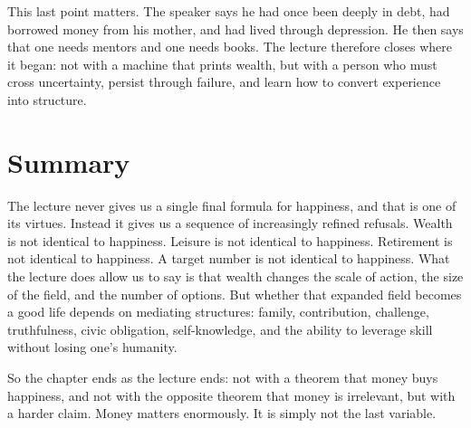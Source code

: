 This last point matters. The speaker says he had once been deeply in debt, had borrowed money from his mother, and had lived through depression. He then says that one needs mentors and one needs books. The lecture therefore closes where it began: not with a machine that prints wealth, but with a person who must cross uncertainty, persist through failure, and learn how to convert experience into structure.

\section{Summary}

The lecture never gives us a single final formula for happiness, and that is one of its virtues. Instead it gives us a sequence of increasingly refined refusals. Wealth is not identical to happiness. Leisure is not identical to happiness. Retirement is not identical to happiness. A target number is not identical to happiness. What the lecture does allow us to say is that wealth changes the scale of action, the size of the field, and the number of options. But whether that expanded field becomes a good life depends on mediating structures: family, contribution, challenge, truthfulness, civic obligation, self-knowledge, and the ability to leverage skill without losing one's humanity.

So the chapter ends as the lecture ends: not with a theorem that money buys happiness, and not with the opposite theorem that money is irrelevant, but with a harder claim. Money matters enormously. It is simply not the last variable.
